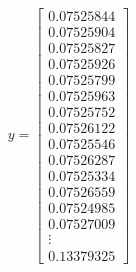 \documentclass[11pt]{extarticle}
\begin{document}
	\begin{align}
		y = \begin{bmatrix}
			0.07525844 \\
			0.07525904 \\
			0.07525827 \\
			0.07525926 \\
			0.07525799 \\
			0.07525963 \\
			0.07525752 \\
			0.07526122 \\
			0.07525546 \\
			0.07526287 \\
			0.07525334 \\
			0.07526559 \\
			0.07524985 \\
			0.07527009 \\
			\vdots \\
			0.13379325 
		\end{bmatrix}
	\end{align}
\end{document}
